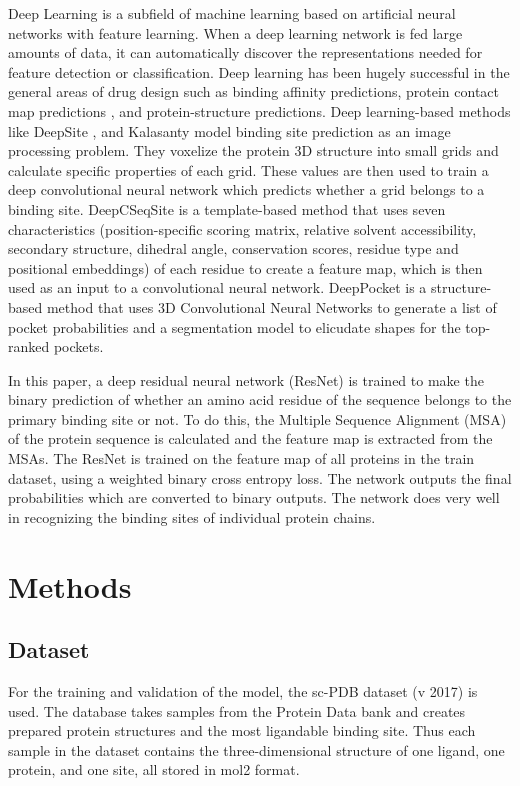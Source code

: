 \documentclass[journal=jacsat,manuscript=article]{achemso}
\begin{document}
Deep Learning is a subfield of machine learning based on artificial neural networks with feature learning. When a deep learning network is fed large amounts of data, it can automatically discover the representations needed for feature detection or classification. Deep learning has been hugely successful in the general areas of drug design such as binding affinity predictions\cite{jimenez2018k,ozturk2018deepdta}, protein contact map predictions \cite{hanson2018accurate,wang2017accurate}, and protein-structure predictions\cite{senior2020improved,li2019ensembling}\cite{tiwari2020network}. Deep learning-based methods like DeepSite \cite{jimenez2017deepsite}, and Kalasanty \cite{stepniewska2020improving} model binding site prediction as an image processing problem. They voxelize the protein 3D structure into small grids and calculate specific properties of each grid. These values are then used to train a deep convolutional neural network which predicts whether a grid belongs to a binding site. DeepCSeqSite \cite{cui2019predicting} is a template-based method that uses seven characteristics (position-specific scoring matrix, relative solvent accessibility, secondary structure, dihedral angle, conservation scores, residue type and positional embeddings) of each residue to create a feature map, which is then used as an input to a convolutional neural network. DeepPocket \cite{aggarwal2021deeppocket} is a structure-based method that uses 3D Convolutional Neural Networks to generate a list of pocket probabilities and a segmentation model to elicudate shapes for the top-ranked pockets.

In this paper, a deep residual neural network (ResNet) is trained to make the binary prediction of whether an amino acid residue of the sequence belongs to the primary binding site or not. To do this, the Multiple Sequence Alignment (MSA) of the protein sequence is calculated and the feature map is extracted from the MSAs. The ResNet is trained on the feature map of all proteins in the train dataset, using a weighted binary cross entropy loss. The network outputs the final probabilities which are converted to binary outputs. The network does very well in recognizing the binding sites of individual protein chains.

\section{Methods}
\subsection{Dataset}
\quad For the training and validation of the model, the sc-PDB\cite{desaphy2015sc} dataset (v 2017) is used. The database takes samples from the Protein Data bank and creates prepared protein structures and the most ligandable binding site. Thus each sample in the dataset contains the three-dimensional structure of one ligand, one protein, and one site, all stored in mol2 format.
\end{document}
